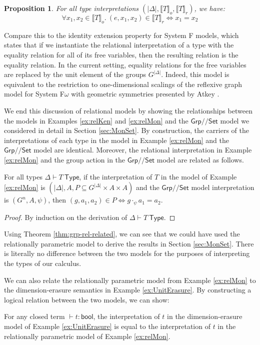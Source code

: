 \documentclass[a4paper,UKenglish]{lipics}
\theoremstyle{plain}
\newtheorem{proposition}[theorem]{Proposition}
\newcommand{\msf}[1]{\mathsf{#1}} %
\newcommand{\Grp}{\msf{Grp}}
\newcommand{\Set}{\msf{Set}}
\newcommand{\Lslice}[1]{#1/\!/\Set}
\newcommand{\GrpSet}{\Lslice{\Grp}}
\newcommand{\semo}[1]{\ensuremath{\llbracket #1 \rrbracket _o}}
\newcommand{\semr}[1]{\ensuremath{\llbracket #1 \rrbracket _r}}
\begin{document}
\begin{example}
  \begin{proposition}
For all type interpretations $(|\Delta|, \semo{T}, \semr{T})$, we have:
\begin{displaymath} \forall x_1, x_2 \in \semo{T}.~(e,x_1,x_2) \in \semr{T} \Leftrightarrow x_1 = x_2
\end{displaymath}
  \end{proposition}
  Compare this to the identity extension property for System F models,
  which states that if we instantiate the relational interpretation of
  a type with the equality relation for all of its free variables,
  then the resulting relation is the equality relation. In the current
  setting, equality relations for the free variables are replaced by
  the unit element of the groups $G^{|\Delta|}$. Indeed, this model is
  equivalent to the restriction to one-dimensional scalings of the
  reflexive graph model for System F$\omega$ with geometric symmetries
  presented by Atkey \cite{atkey14conservation}.
\end{example}

We end this discussion of relational models by showing the
relationships between the models in Examples \ref{ex:relKen} and
\ref{ex:relMon} and the $\GrpSet$ model we considered in detail in
Section \ref{sec:MonSet}. By construction, the carriers of the
interpretations of each type in the model in Example \ref{ex:relMon}
and the $\GrpSet$ model are identical. Moreover, the relational
interpretation in Example \ref{ex:relMon} and the group action in the
$\GrpSet$ model are related as follows.
\begin{theorem}\label{thm:grp-rel-related}
  For all types $\Delta \vdash T~\msf{Type}$, if the interpretation of
  $T$ in the model of Example \ref{ex:relMon} is $(|\Delta|, A, P
  \subseteq G^{|\Delta|} \times A \times A)$ and the $\GrpSet$ model
  interpretation is $(G^n, A, \psi)$, then $(g, a_1, a_2) \in P
  \Leftrightarrow g \cdot_{\psi} a_1 = a_2$.
\end{theorem}
\begin{proof}
  By induction on the derivation of $\Delta \vdash T~\msf{Type}$.
\end{proof}

Using Theorem \ref{thm:grp-rel-related}, we can see that we could have
used the relationally parametric model to derive the results in
Section \ref{sec:MonSet}. There is literally no difference between the
two models for the purposes of interpreting the types of our calculus.

We can also relate the relationally parametric model from Example
\ref{ex:relMon} to the dimension-erasure semantics in Example
\ref{ex:UnitErasure}. By constructing a logical relation between the
two models, we can show:
\begin{theorem}\label{thm:closed-prog-equiv}
  For any closed term $\vdash t : \msf{bool}$, the interpretation of
  $t$ in the dimension-erasure model of Example \ref{ex:UnitErasure}
  is equal to the interpretation of $t$ in the relationally parametric
  model of Example \ref{ex:relMon}.
\end{theorem}
\end{document}
